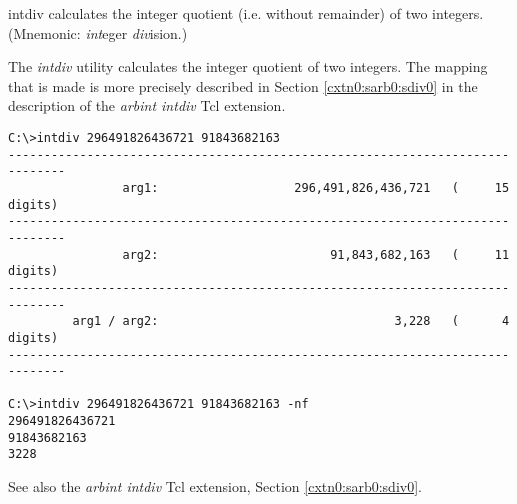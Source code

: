 \begin{dosutilcommandname}{intdiv}%
calculates the integer quotient (i.e. without remainder) of 
two integers.
(Mnemonic:  \emph{int}eger
\emph{div}ision.)
\end{dosutilcommandname}

\begin{dosutilcommandsynopsis}
\end{dosutilcommandsynopsis}

\begin{dosutilcommanddescription}
The \emph{intdiv} utility calculates the integer quotient
of two integers.  The mapping that is made is 
more precisely described in 
Section \ref{cxtn0:sarb0:sdiv0} in the
description of the \emph{arbint intdiv} Tcl extension.
\end{dosutilcommanddescription}

\begin{dosutilcommandsampleinvocations}
\begin{scriptsize}
\begin{verbatim}
C:\>intdiv 296491826436721 91843682163
------------------------------------------------------------------------------
                arg1:                   296,491,826,436,721   (     15 digits)
------------------------------------------------------------------------------
                arg2:                        91,843,682,163   (     11 digits)
------------------------------------------------------------------------------
         arg1 / arg2:                                 3,228   (      4 digits)
------------------------------------------------------------------------------

C:\>intdiv 296491826436721 91843682163 -nf
296491826436721
91843682163
3228
\end{verbatim}
\end{scriptsize}
\end{dosutilcommandsampleinvocations}

\begin{dosutilcommandseealso}
See also the \emph{arbint intdiv} Tcl extension, 
Section \ref{cxtn0:sarb0:sdiv0}.
\end{dosutilcommandseealso}


